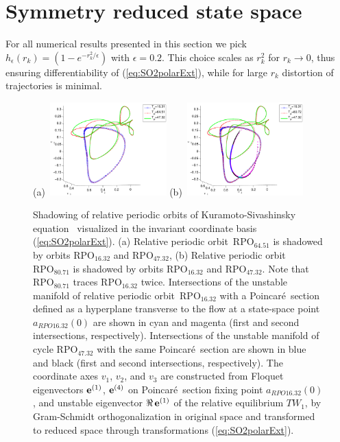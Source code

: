 \documentclass[aip,cha,showpacs,reprint]{revtex4-1} %
\newcommand{\refref} [1] {Ref.~\onlinecite{#1}}
\newcommand{\refeq}  [1] {(\ref{#1})}
\newcommand{\KSe}{Kuramoto-Siva\-shin\-sky equation}
\newcommand{\jEigvec}[1][]{\ensuremath{{\bf e}^{(#1)}}} %
\newcommand{\REQV}[2]{\ensuremath{TW_{#1#2}}} %
\newcommand{\Poincare}{Poincar\'e}
\newcommand{\rpo}{rela\-ti\-ve periodic orbit}
\newcommand{\Rpo}{Rela\-ti\-ve periodic orbit}
\newcommand{\RPO}[1]{\ensuremath{\mathrm{RPO}_{#1}}}
\newcommand{\ssp}{a}            %
\begin{document}
\section{Symmetry reduced state space}


For all numerical results presented in this section we pick
$h_\epsilon(r_k)=(1-e^{-r_k^2/\epsilon})$ with $\epsilon=0.2$. This choice
scales as $r_k^2$ for $r_k\rightarrow 0$, thus ensuring differentiability
of \refeq{eq:SO2polarExt}, while for large $r_k$ distortion of
trajectories is minimal.

\begin{figure}
 (a)~\includegraphics[width=0.40\textwidth]{ks22rpoT6451shad}
 (b)~\includegraphics[width=0.40\textwidth]{ks22rpoT8072shad_manif}
\caption{
 Shadowing of \rpo s of \KSe\
visualized in the invariant coordinate basis \refeq{eq:SO2polarExt}.
(a) \Rpo\ $\RPO{64.51}$ is shadowed by orbits $\RPO{16.32}$ and
$\RPO{47.32}$, (b) \Rpo\ $\RPO{80.71}$ is shadowed by orbits
$\RPO{16.32}$ and $\RPO{47.32}$. Note that $\RPO{80.71}$ traces
$\RPO{16.32}$ twice. Intersections of the unstable manifold of \rpo\
$\RPO{16.32}$ with a \Poincare\ section defined as a hyperplane
transverse to the flow at a state-space point $\ssp_{RPO{16.32}}(0)$ are
shown in cyan and magenta (first and second intersections, respectively).
Intersections of the unstable manifold of cycle $\RPO{47.32}$ with the
same \Poincare\ section are shown in blue and black (first and second
intersections, respectively). The coordinate axes $v_1$, $v_2$, and $v_3$
are constructed from Floquet eigenvectors $\jEigvec[1]$, $\jEigvec[4]$ on
\Poincare\ section fixing point $\ssp_{RPO{16.32}}(0)$, and unstable
eigenvector ${\Re\,} \jEigvec[1]$ of the relative equilibrium
\REQV{}{1}, by Gram-Schmidt orthogonalization in original space and
transformed to reduced space through transformations
\refeq{eq:SO2polarExt}.
}
\label{f:rpo_shad}
\end{figure}
\end{document}
